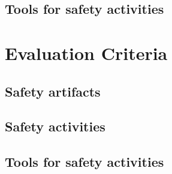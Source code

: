 \documentclass{template/openetcs_article}
\begin{document}
\subsection{Tools for safety activities}

\section{Evaluation Criteria}

\subsection{Safety artifacts}


\subsection{Safety activities}


\subsection{Tools for safety activities}




\nocite{*}






\begin{thebibliography}{9}



\end{thebibliography}

\end{document}
